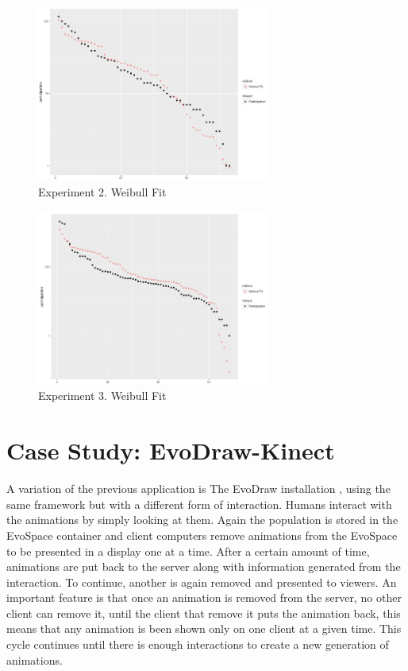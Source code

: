\begin{figure}[!t]
    \centering
        \includegraphics[width=3in]{img/weibull_2.png}
    \caption{Experiment 2. Weibull Fit}
    \label{fig:w2}
\end{figure}
\begin{figure}[!t]
    \centering
        \includegraphics[width=3in]{img/weibull_3.png}
    \caption{Experiment 3. Weibull Fit}
    \label{fig:w3}
\end{figure}


\section{Case Study: EvoDraw-Kinect}

A variation of the previous application is The EvoDraw installation , using the same
framework but with a different form of interaction. Humans interact with the animations 
by simply looking at them. Again the population is stored in the EvoSpace container and
client computers remove animations from the EvoSpace to be presented in a display one at a time. 
After a certain amount of time,  animations are put back to the server along with information 
generated from the interaction. To continue, another is again removed and presented to viewers. 
An important feature is that once an animation is removed from the server, no other client can remove it, 
until the client that remove it puts the animation back, this means that any
animation is been shown only on one client at a given time. This cycle continues until there
is enough interactions to create a new generation of animations. 

